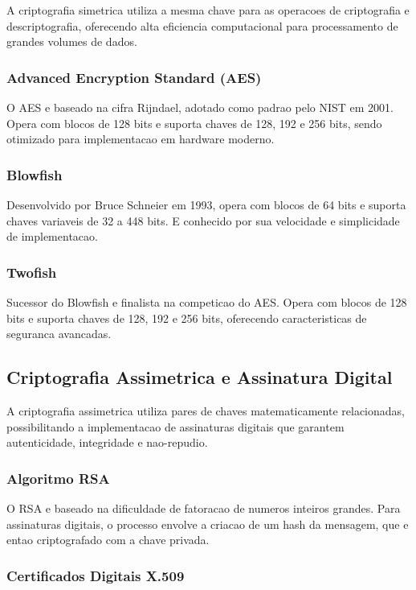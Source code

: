 \documentclass[12pt,a4paper,oneside]{article}
\begin{document}
A criptografia simetrica utiliza a mesma chave para as operacoes de criptografia e descriptografia, oferecendo alta eficiencia computacional para processamento de grandes volumes de dados.

\subsubsection{Advanced Encryption Standard (AES)}

O AES e baseado na cifra Rijndael, adotado como padrao pelo NIST em 2001. Opera com blocos de 128 bits e suporta chaves de 128, 192 e 256 bits, sendo otimizado para implementacao em hardware moderno.

\subsubsection{Blowfish}

Desenvolvido por Bruce Schneier em 1993, opera com blocos de 64 bits e suporta chaves variaveis de 32 a 448 bits. E conhecido por sua velocidade e simplicidade de implementacao.

\subsubsection{Twofish}

Sucessor do Blowfish e finalista na competicao do AES. Opera com blocos de 128 bits e suporta chaves de 128, 192 e 256 bits, oferecendo caracteristicas de seguranca avancadas.

\subsection{Criptografia Assimetrica e Assinatura Digital}

A criptografia assimetrica utiliza pares de chaves matematicamente relacionadas, possibilitando a implementacao de assinaturas digitais que garantem autenticidade, integridade e nao-repudio.

\subsubsection{Algoritmo RSA}

O RSA e baseado na dificuldade de fatoracao de numeros inteiros grandes. Para assinaturas digitais, o processo envolve a criacao de um hash da mensagem, que e entao criptografado com a chave privada.

\subsubsection{Certificados Digitais X.509}
\end{document}
